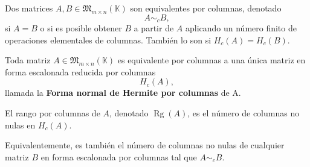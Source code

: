 \documentclass[a4paper,12pt]{article}
\begin{document}
\begin{procedimiento}[title=Matrices equivalentes por columnas]
Dos matrices $A,B \in \mathfrak{M}_{m \times n}(\mathbb{K})$ son equivalentes por columnas, denotado
\[
A \sim_c B,
\]
si $A=B$ o si es posible obtener $B$ a partir de $A$ aplicando un número finito de operaciones elementales de columnas. También lo son si $H_c(A) = H_c(B)$.
\end{procedimiento}

\begin{procedimiento}[title=Forma normal de Hermite por columnas]
Toda matriz $A \in \mathfrak{M}_{m \times n}(\mathbb{K})$ es equivalente por columnas a una única matriz en forma escalonada reducida por columnas
\[
H_c(A),
\]
llamada la \textbf{Forma normal de Hermite por columnas} de A. 
\end{procedimiento}

\begin{procedimiento}[title=Rango por columnas]
El rango por columnas de $A$, denotado $\operatorname{Rg}(A)$, es el número de columnas no nulas en $H_c(A)$.

Equivalentemente, es también el número de columnas no nulas de cualquier matriz $B$ en forma escalonada por columnas tal que $A \sim_c B$.
\end{procedimiento}
\end{document}
